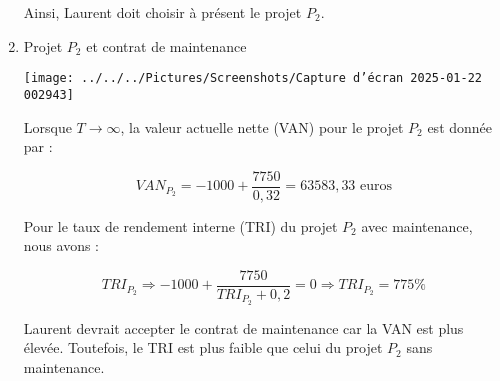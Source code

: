 \documentclass[a4paper, 12pt]{report}
\begin{document}
\begin{enumerate}
Ainsi, Laurent doit choisir à présent le projet \( P_2 \).

\item Projet \( P_2 \) et contrat de maintenance

\begin{center}
	
	\texttt{[image: ../../../Pictures/Screenshots/Capture d'écran 2025-01-22 002943]}

\end{center}

Lorsque \( T \to \infty \), la valeur actuelle nette (VAN) pour le projet \( P_2 \) est donnée par :

\[
VAN_{P_2} = -1000 + \frac{7750}{0,32} = 63583,33 \text{ euros}
\]

Pour le taux de rendement interne (TRI) du projet \( P_2 \) avec maintenance, nous avons :

\[
TRI_{P_2} \Rightarrow -1000 + \frac{7750}{TRI_{P_2} + 0,2} = 0 \Rightarrow TRI_{P_2} = 775\%
\]

Laurent devrait accepter le contrat de maintenance car la VAN est plus élevée. Toutefois, le TRI est plus faible que celui du projet \( P_2 \) sans maintenance.




















\end{enumerate}
\end{document}
